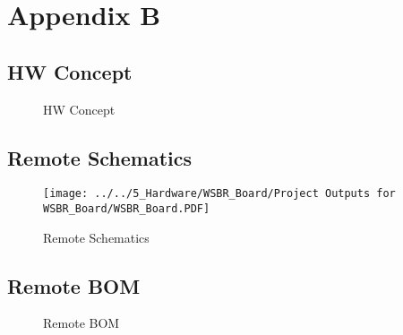 \chapter{Appendix B}
\label{cha:Appendix B}


\section{HW Concept}
\label{sec:HW Concept}
\begin{figure}[H]
	\centering
	\caption{HW Concept}
	\label{fig:HW Concept}
\end{figure}


\section{Remote Schematics}
\label{sec:Schematics}
\begin{figure}[H]
	\centering
	\texttt{[image: ../../5\_Hardware/WSBR\_Board/Project Outputs for WSBR\_Board/WSBR\_Board.PDF]}
	\caption{Remote Schematics}
	\label{fig:Remote Schematics}
\end{figure}
\newpage


\section{Remote BOM}
\label{sec:Remote BOM}
\begin{figure}[H]
	\centering
	\caption{Remote BOM}
	\label{fig:Remote BOM}
\end{figure}
\newpage